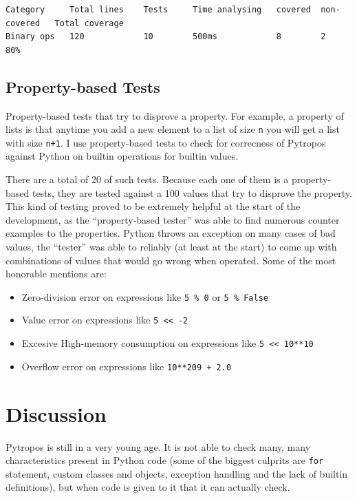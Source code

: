 \documentclass[
11pt, %
english, %
singlespacing, %
headsepline, %
]{MastersDoctoralThesis} %
\providecommand{\tightlist}{%
  \setlength{\itemsep}{0pt}\setlength{\parskip}{0pt}}
\begin{document}
\begin{verbatim}
Category     Total lines    Tests     Time analysing   covered  non-covered   Total coverage
Binary ops   120            10        500ms            8        2             80%
\end{verbatim}

\hypertarget{property-based-tests}{%
\subsection{Property-based Tests}\label{property-based-tests}}

Property-based tests that try to disprove a property. For example, a
property of lists is that anytime you add a new element to a list of
size \texttt{n} you will get a list with size \texttt{n+1}. I use
property-based tests to check for correcness of Pytropos against Python
on builtin operations for builtin values.

There are a total of 20 of such tests. Because each one of them is a
property-based tests, they are tested against a 100 values that try to
disprove the property. This kind of testing proved to be extremely
helpful at the start of the development, as the \enquote{property-based
tester} was able to find numerous counter examples to the properties.
Python throws an exception on many cases of bad values, the
\enquote{tester} was able to reliably (at least at the start) to come up
with combinations of values that would go wrong when operated. Some of
the most honorable mentions are:

\begin{itemize}
\tightlist
\item
  Zero-division error on expressions like \texttt{5\ \%\ 0} or
  \texttt{5\ \%\ False}
\item
  Value error on expressions like \texttt{5\ \textless{}\textless{}\ -2}
\item
  Excesive High-memory consumption on expressions like
  \texttt{5\ \textless{}\textless{}\ 10**10}
\item
  Overflow error on expressions like \texttt{10**209\ +\ 2.0}
\end{itemize}

\hypertarget{discussion}{%
\section{Discussion}\label{discussion}}

Pytropos is still in a very young age. It is not able to check many,
many characteristics present in Python code (some of the biggest
culprits are \texttt{for} statement, custom classes and objects,
exception handling and the lack of builtin definitions), but when code
is given to it that it can actually check.
\end{document}

